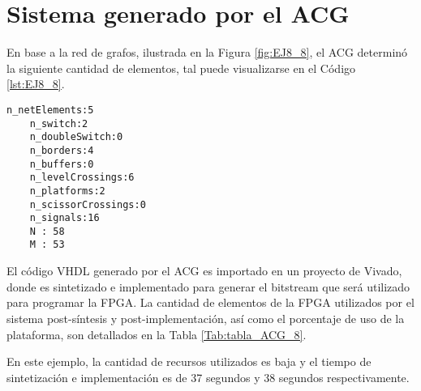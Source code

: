 \section{Sistema generado por el ACG}

	En base a la red de grafos, ilustrada en la Figura \ref{fig:EJ8_8}, el ACG determinó la siguiente cantidad de elementos, tal puede visualizarse en el Código \ref{lst:EJ8_8}.
	
	\begin{lstlisting}[language = {}, caption = Cantidad de elementos a implementar por el ACG, label = {lst:EJ8_8}]
	n_netElements:5
	n_switch:2
	n_doubleSwitch:0
	n_borders:4
	n_buffers:0
	n_levelCrossings:6
	n_platforms:2
	n_scissorCrossings:0
	n_signals:16
	N : 58
	M : 53
	\end{lstlisting}
	
	El código VHDL generado por el ACG es importado en un proyecto de Vivado, donde es sintetizado e implementado para generar el bitstream que será utilizado para programar la FPGA. La cantidad de elementos de la FPGA utilizados por el sistema post-síntesis y post-implementación, así como el porcentaje de uso de la plataforma, son detallados en la Tabla \ref{Tab:tabla_ACG_8}.
	
	\begin{table}[H]
		{
			\caption{Síntesis e implementación del ejemplo 8 generado por el ACG.}
			\label{Tab:tabla_ACG_8}
			\centering
			\begin{center}
			\end{center}
		}    
	\end{table}
	
	En este ejemplo, la cantidad de recursos utilizados es baja y el tiempo de sintetización e implementación es de 37 segundos y 38 segundos respectivamente.
